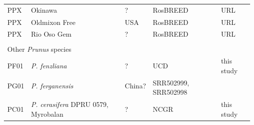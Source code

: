 \documentclass[12pt]{article}
\begin{document}
\begin{center}
\begin{longtable}{lllll}
                 PP{\color{red}X} &Okinawa &? &RosBREED &URL \\
                 PP{\color{red}X} &Oldmixon Free &USA &RosBREED &URL \\
                 PP{\color{red}X} &Rio Oso Gem &? &RosBREED &URL \\
                 \multicolumn{5}{l}{} \\
                 \multicolumn{5}{l}{Other \emph{Prunus} species}  \\
                 PF01 &\emph{P. fenzliana} &? &UCD &this study\\
                 PG01 &\emph{P. ferganensis} &China? &\multirow{2}{1cm}{SRR502999, SRR502998} &\citealt{verde2013high}\\
                 \\
                 PC01 &\emph{P. cerasifera} DPRU 0579, Myrobalan &? &NCGR &this study\\ \hline

\end{longtable}
\end{center}
\end{document}
